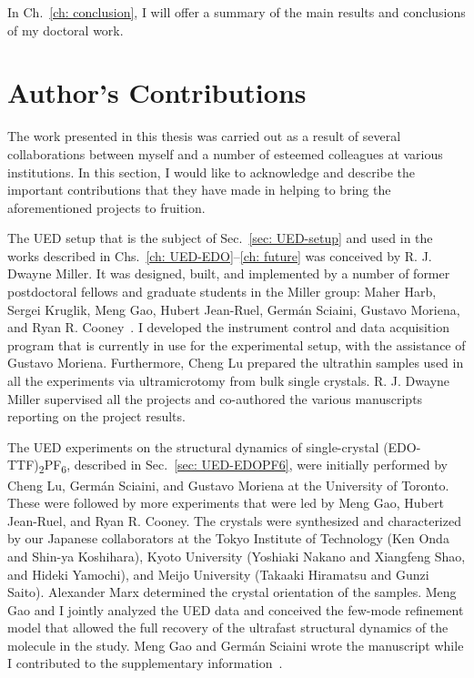In Ch.~\ref{ch: conclusion}, I will offer a summary of the main results and conclusions
of my doctoral work.

\section{Author's Contributions}

The work presented in this thesis was carried out as a result of several collaborations between myself
and a number of esteemed colleagues at various institutions. In this section, I would like to acknowledge
and describe the important contributions that they have made in helping
to bring the aforementioned projects to fruition.

The UED setup that is the subject of Sec.~\ref{sec: UED-setup} and used in the works described in
Chs.~\ref{ch: UED-EDO}--\ref{ch: future} was conceived by R. J. Dwayne Miller. It was designed,
built, and implemented by a number of former postdoctoral fellows and graduate students
in the Miller group: Maher Harb, Sergei Kruglik, Meng Gao, Hubert Jean-Ruel, Germ\'{a}n Sciaini, Gustavo Moriena,
and Ryan R. Cooney~\cite{Hubert-thesis, Gao2012}. I developed the instrument control and data acquisition
program that is currently in use for the experimental setup, with the assistance of Gustavo Moriena.
Furthermore, Cheng Lu prepared the ultrathin samples used in all the experiments via ultramicrotomy
from bulk single crystals. R. J. Dwayne Miller supervised all the projects and
co-authored the various manuscripts reporting on the project results.

The UED experiments on the structural dynamics of
single-crystal (EDO-TTF)\textsubscript{2}PF\textsubscript{6},
described in Sec.~\ref{sec: UED-EDOPF6}, were initially performed by Cheng Lu, Germ\'{a}n Sciaini,
and Gustavo Moriena at the University of Toronto. These were followed by more experiments that were led
by Meng Gao, Hubert Jean-Ruel, and Ryan R. Cooney. The crystals were synthesized and characterized
by our Japanese collaborators at the Tokyo Institute of Technology
(Ken Onda and Shin-ya Koshihara),
Kyoto University (Yoshiaki Nakano and Xiangfeng Shao, and Hideki Yamochi),
and Meijo University (Takaaki Hiramatsu and Gunzi Saito).
Alexander Marx determined the crystal orientation of the samples.
Meng Gao and I jointly analyzed the UED data and conceived the few-mode refinement model that
allowed the full recovery of the ultrafast structural dynamics of the molecule in the study.
Meng Gao and Germ\'{a}n Sciaini wrote the manuscript
while I contributed to the supplementary information~\cite{Gao2013}.

